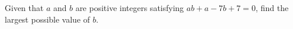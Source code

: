 Given that $a$ and $b$ are positive integers satisfying $ab+a-7b+7=0$, find the largest possible value of $b$.
